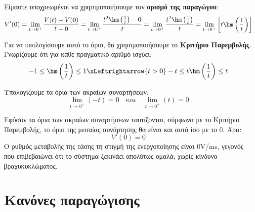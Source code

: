 Είμαστε υποχρεωμένοι να χρησιμοποιήσουμε τον \textbf{ορισμό της παραγώγου}:
\[ V'(0) = \lim\limits_{t \to 0^+} \frac{V(t) - V(0)}{t - 0} = \lim\limits_{t \to 0^+} \frac{t^2 \hm\left(\frac{1}{t}\right) - 0}{t} = \lim\limits_{t \to 0^+} \frac{t^2 \hm\left(\frac{1}{t}\right)}{t} = \lim\limits_{t \to 0^+} \left[ t \hm\left(\frac{1}{t}\right) \right] \]

Για να υπολογίσουμε αυτό το όριο, θα χρησιμοποιήσουμε το \textbf{Κριτήριο Παρεμβολής}. Γνωρίζουμε ότι για κάθε πραγματικό αριθμό ισχύει:
\[ -1 \le \hm\left(\frac{1}{t}\right) \le 1 \xLeftrightarrow{t>0} -t \le t \hm\left(\frac{1}{t}\right) \le t \]

Υπολογίζουμε τα όρια των ακραίων συναρτήσεων:
\[ \lim\limits_{t \to 0^+} (-t) = 0 \quad \text{και} \quad \lim\limits_{t \to 0^+} (t) = 0 \]

Εφόσον τα όρια των ακραίων συναρτήσεων ταυτίζονται, σύμφωνα με το Κριτήριο Παρεμβολής, το όριο της μεσαίας συνάρτησης θα είναι και αυτό ίσο με το $0$. Άρα:
\[ V'(0) = 0 \]
Ο ρυθμός μεταβολής της τάσης τη στιγμή της ενεργοποίησης είναι $0$\si{V/ms}, γεγονός που επιβεβαιώνει ότι το σύστημα ξεκινάει απολύτως ομαλά, χωρίς κίνδυνο βραχυκυκλώματος.

\section{Κανόνες παραγώγισης}
\lysh

